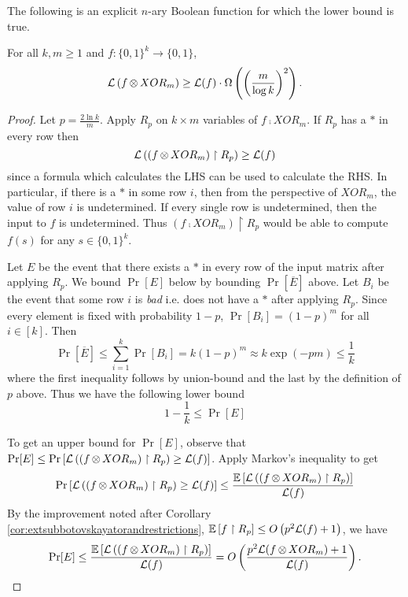 \documentclass[11pt]{article}
\begin{document}
	The following is an explicit $n$-ary Boolean function for which the lower bound is true.
	\begin{lemma}
		\label{lem:bdcompfwithxor}
		For all $k, m \geq 1$ and $f: \{0,1\}^k \rightarrow \{0,1\}$,
		\[\mathcal{L}\left(f\operatorname*{\otimes} XOR_m\right) \geq \mathcal{L}(f) \cdot \Omega\left(\left(\frac{m}{\log k}\right)^2\right).\]
	\end{lemma}
	\begin{proof}
		Let $p = \frac{2\ln k}{m}$. Apply $R_p$ on $k\times m$ variables of $f \comp XOR_m$. If $R_p$ has a $*$ in every row then 
		\[\mathcal{L}\left(\left(f\operatorname*{\otimes} XOR_m\right) \upharpoonright R_p\right) \geq \mathcal{L}(f)\]
		since a formula which calculates the LHS can be used to calculate the RHS. In particular, if there is a $*$ in some row $i$, then from the perspective of $XOR_m$, the value of row $i$ is undetermined. If every single row is undetermined, then the input to $f$ is undetermined. Thus $\left(f \comp XOR_m\right) \upharpoonright R_p$ would be able to compute $f(s)$ for any $s \in \{0,1\}^k$.
		
		Let $E$ be the event that there exists a $*$ in every row of the input matrix after applying $R_p$. We bound $\Pr[E]$ below by bounding $\Pr\left[\overline{E}\right]$ above. Let $B_i$ be the event that some row $i$ is \emph{bad} i.e. does not have a $*$ after applying $R_p$. Since every element is fixed with probability $1-p$, $\Pr[B_i] = (1 - p)^{m}$ for all $i \in [k]$. Then 
		\[\Pr\left[\overline{E}\right] \leq \sum_{i = 1}^{k} \Pr[B_i] = k(1-p)^{m} \approx k\exp(-pm) \leq \frac{1}{k}\] 
		where the first inequality follows by union-bound and the last by the definition of $p$ above. Thus we have the following lower bound
		\begin{equation}
		\label{eq:lbdlembdcomfwithxor}
		1 - \frac{1}{k} \leq \Pr\left[E\right] 
		\end{equation} 
		
		To get an upper bound for $\Pr[E]$, observe that $\Pr[E] \leq \Pr\left[\mathcal{L}\left(\left(f \operatorname*{\otimes} XOR_m\right) \upharpoonright R_p\right) \geq \mathcal{L}(f)\right]$. Apply Markov's inequality to get
		\[\Pr\left[\mathcal{L}\left(\left(f \operatorname*{\otimes} XOR_m\right) \upharpoonright R_p\right) \geq \mathcal{L}(f)\right] \leq \frac{\operatorname{\mathbb{E}}\left[\mathcal{L}\left(\left(f \operatorname*{\otimes} XOR_m\right) \upharpoonright R_p\right)\right]}{\mathcal{L}(f)}\]
		By the improvement noted after Corollary \ref{cor:extsubbotovskayatorandrestrictions}, $\operatorname{\mathbb{E}}\left[f \upharpoonright R_p\right] \leq O\left(p^2\mathcal{L}(f) + 1\right)$, we have
		\begin{equation}
		\label{eq:ubdlembdcomfwithxor}
		\Pr[E] \leq \frac{\operatorname{\mathbb{E}}\left[\mathcal{L}\left(\left(f \operatorname*{\otimes} XOR_m\right) \upharpoonright R_p\right)\right]}{\mathcal{L}(f)} = O\left(\frac{p^2\mathcal{L}(f \operatorname*{\otimes} XOR_m) + 1}{\mathcal{L}(f)}\right). 
		\end{equation} 
		

\end{proof}
\end{document}

